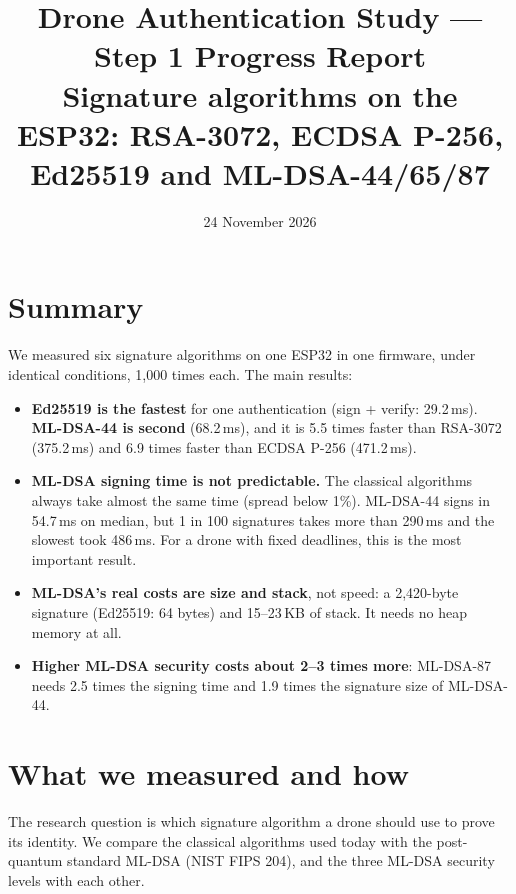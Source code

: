\documentclass[10pt,a4paper]{article}
\title{Drone Authentication Study --- Step 1 Progress Report\\[3pt]
\large Signature algorithms on the ESP32: RSA-3072, ECDSA P-256, Ed25519 and ML-DSA-44/65/87}
\author{}
\date{24 November 2026}
\begin{document}
\maketitle

\section*{Summary}

We measured six signature algorithms on one ESP32 in one firmware, under identical
conditions, 1,000 times each. The main results:

\begin{itemize}[nosep]
  \item \textbf{Ed25519 is the fastest} for one authentication (sign + verify: 29.2\,ms).
        \textbf{ML-DSA-44 is second} (68.2\,ms), and it is 5.5 times faster than RSA-3072
        (375.2\,ms) and 6.9 times faster than ECDSA P-256 (471.2\,ms).
  \item \textbf{ML-DSA signing time is not predictable.} The classical algorithms always take
        almost the same time (spread below 1\%). ML-DSA-44 signs in 54.7\,ms on median, but
        1 in 100 signatures takes more than 290\,ms and the slowest took 486\,ms. For a drone
        with fixed deadlines, this is the most important result.
  \item \textbf{ML-DSA's real costs are size and stack}, not speed: a 2,420-byte signature
        (Ed25519: 64 bytes) and 15--23\,KB of stack. It needs no heap memory at all.
  \item \textbf{Higher ML-DSA security costs about 2--3 times more}: ML-DSA-87 needs 2.5 times
        the signing time and 1.9 times the signature size of ML-DSA-44.
\end{itemize}

\section{What we measured and how}

The research question is which signature algorithm a drone should use to prove its identity.
We compare the classical algorithms used today with the post-quantum standard ML-DSA (NIST
FIPS 204), and the three ML-DSA security levels with each other.
\end{document}
